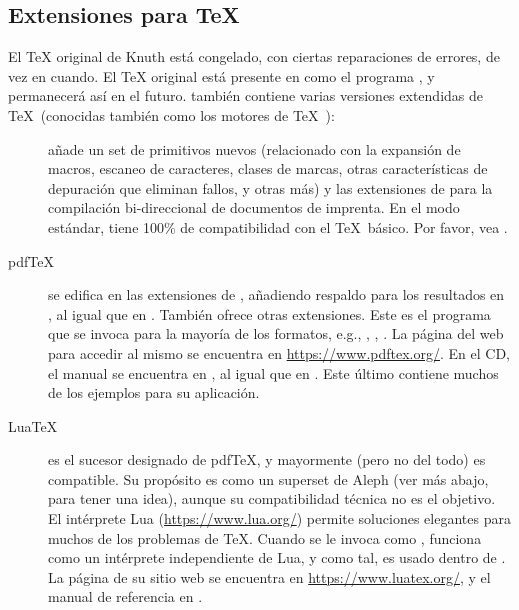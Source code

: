 \documentclass{article}
\begin{document}
\subsection{Extensiones para \protect\TeX}
\label{sec:tex-extensions}

El \TeX{} original de Knuth está congelado, con ciertas reparaciones
de errores, de vez en cuando. El \TeX{} original está presente en \TL{} como el
programa , y permanecerá así en el futuro. \TL{} también contiene
varias versiones extendidas de \TeX\ (conocidas también como los motores de
\TeX\ ):

\begin{description}

\item [\eTeX] añade un set de primitivos nuevos
\label{text:etex} (relacionado con la expansión de macros, escaneo de
caracteres, clases de marcas, otras características de depuración que
eliminan fallos, y otras más) y las extensiones de \TeXXeT{} para la
compilación bi-direccional de documentos de imprenta. En el modo
estándar, \eTeX{} tiene 100\% de compatibilidad con el \TeX\
básico.
Por favor, vea .

\item [pdf\TeX] se edifica en las extensiones de \eTeX{}, añadiendo
	respaldo para los resultados en \acro{PDF}, al igual que en
	\dvi{}. También ofrece otras extensiones. Este es el programa
	que se invoca para la mayoría de los formatos, e.g.,
	, , . La página del web
	para accedir al mismo se encuentra en
	\url{https://www.pdftex.org/}. En el CD, el manual se encuentra
	en , al igual
	que en
	.
	Este último contiene muchos de los ejemplos para su
	aplicación.

\item [Lua\TeX] es el sucesor designado de pdf\TeX, y mayormente (pero
	no del todo) es compatible. Su propósito es como un superset
	de Aleph (ver más abajo, para tener una idea), aunque su
	compatibilidad técnica no es el objetivo. El intérprete Lua
	(\url{https://www.lua.org/}) permite soluciones elegantes para
	muchos de los problemas de \TeX{}. Cuando se le invoca como
	, funciona como un intérprete independiente
	de Lua, y como tal, es usado dentro de \TL{}. La página de su
	sitio web se encuentra en \url{https://www.luatex.org/}, y el
	manual de referencia en
	.


\end{description}
\end{document}
